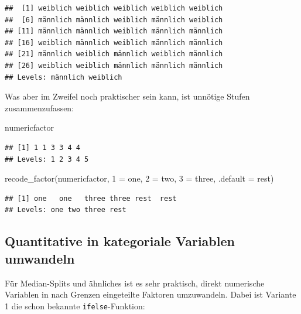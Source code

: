 \documentclass[
]{book}
\newenvironment{Shaded}{\begin{snugshade}}{\end{snugshade}}
\newcommand{\AttributeTok}[1]{\textcolor[rgb]{0.77,0.63,0.00}{#1}}
\newcommand{\FunctionTok}[1]{\textcolor[rgb]{0.00,0.00,0.00}{#1}}
\newcommand{\NormalTok}[1]{#1}
\newcommand{\OtherTok}[1]{\textcolor[rgb]{0.56,0.35,0.01}{#1}}
\newcommand{\StringTok}[1]{\textcolor[rgb]{0.31,0.60,0.02}{#1}}
\begin{document}
\begin{verbatim}
##  [1] weiblich weiblich weiblich weiblich weiblich
##  [6] männlich männlich weiblich männlich weiblich
## [11] männlich männlich weiblich männlich männlich
## [16] weiblich männlich weiblich männlich männlich
## [21] männlich weiblich männlich weiblich männlich
## [26] weiblich weiblich männlich männlich männlich
## Levels: männlich weiblich
\end{verbatim}

Was aber im Zweifel noch praktischer sein kann, ist unnötige Stufen zusammenzufassen:

\begin{Shaded}
\begin{Highlighting}[]
\NormalTok{numericfactor}
\end{Highlighting}
\end{Shaded}

\begin{verbatim}
## [1] 1 1 3 3 4 4
## Levels: 1 2 3 4 5
\end{verbatim}

\begin{Shaded}
\begin{Highlighting}[]
\FunctionTok{recode\_factor}\NormalTok{(numericfactor,}
              \StringTok{\textquotesingle{}1\textquotesingle{}} \OtherTok{=} \StringTok{\textquotesingle{}one\textquotesingle{}}\NormalTok{,}
              \StringTok{\textquotesingle{}2\textquotesingle{}} \OtherTok{=} \StringTok{\textquotesingle{}two\textquotesingle{}}\NormalTok{,}
              \StringTok{\textquotesingle{}3\textquotesingle{}} \OtherTok{=} \StringTok{\textquotesingle{}three\textquotesingle{}}\NormalTok{,}
              \AttributeTok{.default =} \StringTok{\textquotesingle{}rest\textquotesingle{}}\NormalTok{)}
\end{Highlighting}
\end{Shaded}

\begin{verbatim}
## [1] one   one   three three rest  rest 
## Levels: one two three rest
\end{verbatim}

\hypertarget{quantitative-in-kategoriale-variablen-umwandeln}{%
\subsection{Quantitative in kategoriale Variablen umwandeln}\label{quantitative-in-kategoriale-variablen-umwandeln}}

Für Median-Splits und ähnliches ist es sehr praktisch, direkt numerische Variablen in nach Grenzen eingeteilte Faktoren umzuwandeln. Dabei ist Variante 1 die schon bekannte \texttt{ifelse}-Funktion:
\end{document}
